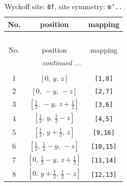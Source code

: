 \documentclass[fleqn,8pt]{jsarticle}
\begin{document}
\begin{longtable}{ccc}
\caption{Wyckoff site: {\tt 8f}, site symmetry: {\tt m'..}}
 \\
 \hline \hline
No. & position & mapping \\ \hline \endfirsthead

\multicolumn{2}{l}{\tablename\ \thetable{}} \\
 \hline \hline
No. & position & mapping \\ \hline \endhead

 \hline \hline
\multicolumn{2}{r}{\footnotesize\it continued ...} \\ \endfoot

 \hline \hline
\multicolumn{2}{r}{} \\ \endlastfoot

1 & $\left[ 0,\, y,\, z \right]$ & {\tt [1,8]} \\ \hline
2 & $\left[ 0,\, - y,\, - z \right]$ & {\tt [2,7]} \\ \hline
3 & $\left[ \frac{1}{2},\, - y,\, z + \frac{1}{2} \right]$ & {\tt [3,6]} \\ \hline
4 & $\left[ \frac{1}{2},\, y,\, \frac{1}{2} - z \right]$ & {\tt [4,5]} \\ \hline
5 & $\left[ \frac{1}{2},\, y + \frac{1}{2},\, z \right]$ & {\tt [9,16]} \\ \hline
6 & $\left[ \frac{1}{2},\, \frac{1}{2} - y,\, - z \right]$ & {\tt [10,15]} \\ \hline
7 & $\left[ 0,\, \frac{1}{2} - y,\, z + \frac{1}{2} \right]$ & {\tt [11,14]} \\ \hline
8 & $\left[ 0,\, y + \frac{1}{2},\, \frac{1}{2} - z \right]$ & {\tt [12,13]} \\
\end{longtable}
\renewcommand{\arraystretch}{1.2}
\end{document}
